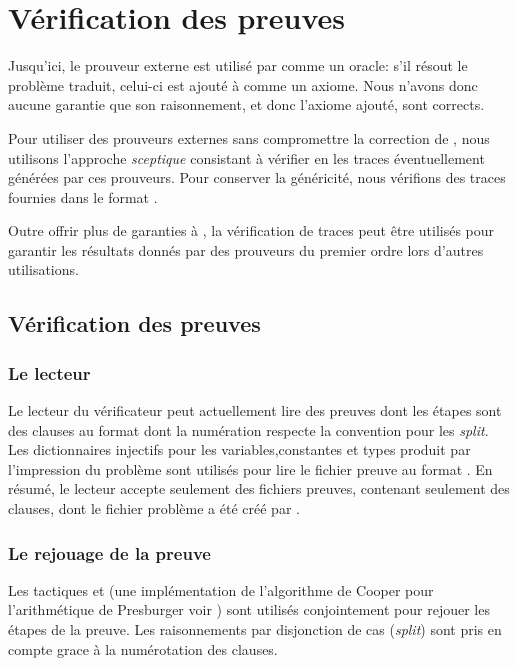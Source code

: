 \section{Vérification des preuves \tff}
\label{sec:traces}

Jusqu'ici, le prouveur externe est utilisé par \holfour comme un
oracle: s'il résout le problème traduit, celui-ci est ajouté à \holfour
comme un axiome. Nous n'avons donc aucune garantie que son raisonnement,
et donc l'axiome ajouté, sont corrects.

Pour utiliser des prouveurs externes sans compromettre la correction de
\holfour, nous utilisons l'approche \emph{sceptique} consistant à
vérifier en \holfour les traces éventuellement générées par ces
prouveurs. Pour conserver la généricité, nous vérifions des traces
fournies dans le format \tff.

Outre offrir plus de garanties à \holfour, la vérification de traces
\tff peut être utilisés pour garantir les résultats donnés par des
prouveurs du premier ordre lors d'autres utilisations.


\subsection{Vérification des preuves}

\subsubsection{Le lecteur}
Le lecteur du vérificateur peut actuellement lire des preuves dont les étapes sont des clauses au format \tff dont la numération respecte la convention \tff pour les \textit{split}. Les dictionnaires injectifs pour les variables,constantes et types produit par l'impression du problème sont utilisés pour lire le fichier preuve au format \tff. En résumé, le lecteur accepte seulement des fichiers preuves, contenant seulement des clauses, dont le fichier problème a été créé par \holfour.

\subsubsection{Le rejouage de la preuve}
Les tactiques \metistac et \coopertac (une implémentation de l'algorithme de Cooper pour l'arithmétique de Presburger voir \cite{Norrish03completeinteger})
sont utilisés conjointement pour rejouer les étapes de la preuve. 
Les raisonnements par disjonction de cas (\textit{split}) sont pris en compte grace à la numérotation des clauses.


